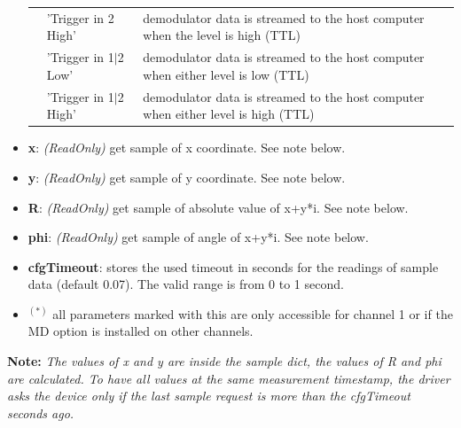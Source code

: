 \documentclass[11pt]{article} %
\begin{document}
\begin{itemize}
\begin{longtable}{p{0.8cm}p{3.1cm}p{12.6cm}}
	&'Trigger in 2 High' & demodulator data is streamed to the host computer when the level is high (TTL) \\
	&'Trigger in 1$\mid$2 Low' & demodulator data is streamed to the host computer when either level is low (TTL) \\
	&'Trigger in 1$\mid$2 High' & demodulator data is streamed to the host computer when either level is high (TTL) \\
	\end{longtable}
	\item {\bf x}: {\it (ReadOnly)} get sample of x coordinate. See note below.
	\item {\bf y}: {\it (ReadOnly)} get sample of y coordinate. See note below.
	\item {\bf R}: {\it (ReadOnly)} get sample of absolute value of x+y*i. See note below.
	\item {\bf phi}: {\it (ReadOnly)} get sample of angle of x+y*i. See note below.
	\item {\bf cfgTimeout}: stores the  used timeout in seconds for the readings of sample data (default 0.07). The valid range is from 0 to 1 second.
	\item $^{(*)}$ all parameters marked with this are only accessible for channel 1 or if the MD option is installed on other channels.
	\end{itemize}
	{\bf Note:} {\it The values of x and y are inside the sample dict, the values of R and phi are calculated. To have all values at the same measurement timestamp, the driver asks the device only if the last sample request is more than the cfgTimeout seconds ago.}
\end{document}
